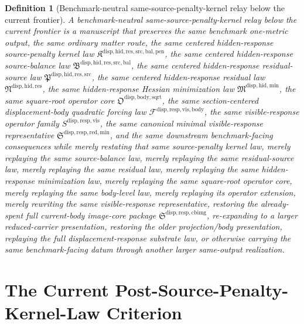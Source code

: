 \documentclass[11pt]{article}
\newcommand{\SourcePenaltyKernelLawPackage}{\mathfrak K^{\mathrm{disp,hid,res,src,bal,pen}}}
\newcommand{\SourceBalanceLawPackage}{\mathfrak B^{\mathrm{disp,hid,res,src,bal}}}
\newcommand{\ResidualSourceLawPackage}{\mathfrak P^{\mathrm{disp,hid,res,src}}}
\newcommand{\ResidualLawPackage}{\mathfrak N^{\mathrm{disp,hid,res}}}
\newcommand{\HiddenMinimizationPackage}{\mathfrak M^{\mathrm{disp,hid,min}}}
\newcommand{\SquareRootOperatorCore}{\mathfrak O^{\mathrm{disp,body,sqrt}}}
\newcommand{\VisibleBodyForcingLaw}{\mathscr F^{\mathrm{disp,resp,vis,body}}}
\newcommand{\VisibleResponseOperator}{S^{\mathrm{disp,resp,vis}}}
\newcommand{\MinimalReducedStructure}{\mathfrak S^{\mathrm{disp,resp,red,min}}}
\newcommand{\CurrentBodyImageCore}{\mathfrak S^{\mathrm{disp,resp,cbimg}}}
\newtheorem{definition}{Definition}
\begin{document}
\begin{definition}[Benchmark-neutral same-source-penalty-kernel relay below the current frontier]
A \emph{benchmark-neutral same-source-penalty-kernel relay below the current frontier} is a manuscript that preserves the same benchmark one-metric output, the same ordinary matter route, the same centered hidden-response source-penalty kernel law \(\SourcePenaltyKernelLawPackage\), the same centered hidden-response source-balance law \(\SourceBalanceLawPackage\), the same centered hidden-response residual-source law \(\ResidualSourceLawPackage\), the same centered hidden-response residual law \(\ResidualLawPackage\), the same hidden-response Hessian minimization law \(\HiddenMinimizationPackage\), the same square-root operator core \(\SquareRootOperatorCore\), the same section-centered displacement-body quadratic forcing law \(\VisibleBodyForcingLaw\), the same visible-response operator family \(\VisibleResponseOperator\), the same canonical minimal visible-response representative \(\MinimalReducedStructure\), and the same downstream benchmark-facing consequences while merely restating that same source-penalty kernel law, merely replaying the same source-balance law, merely replaying the same residual-source law, merely replaying the same residual law, merely replaying the same hidden-response minimization law, merely replaying the same square-root operator core, merely replaying the same body-level law, merely replaying its operator extension, merely rewriting the same visible-response representative, restoring the already-spent full current-body image-core package \(\CurrentBodyImageCore\), re-expanding to a larger reduced-carrier presentation, restoring the older projection/body presentation, replaying the full displacement-response substrate law, or otherwise carrying the same benchmark-facing datum through another larger same-output realization.
\end{definition}

\section{The Current Post-Source-Penalty-Kernel-Law Criterion}
\end{document}
